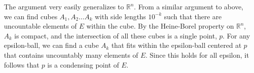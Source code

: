 \documentclass{article}
\newcommand{\R}{\mathbb{R}}
\begin{document}
The argument very easily generalizes to $\R^n$. From a similar argument to above, we can find cubes $A_1, A_2 \dots A_k$ with side lengths $10^{-k}$ such that there are uncountable elements of $E$ within the cube. By the Heine-Borel property on $\R^n$, $A_k$ is compact, and the intersection of all these cubes is a single point, $p$. For any epsilon-ball, we can find a cube $A_k$ that fits within the epsilon-ball centered at $p$ that contains uncountably many elements of $E$. Since this holds for all epsilon, it follows that $p$ is a condensing point of $E$.
\end{document}
